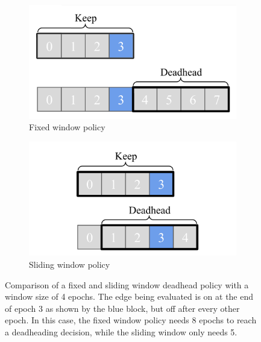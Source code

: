 \begin{figure}[ht!]
\centering
\begin{subfigure}{.5\textwidth}
  \centering
  \includegraphics[width=\linewidth]{dh/fixed}
  \caption{Fixed window policy}
\end{subfigure}%
\begin{subfigure}{.5\textwidth}
  \centering
  \includegraphics[width=\linewidth]{dh/sliding}
  \caption{Sliding window policy}
\end{subfigure}
\caption[Comparison of fixed and sliding window deadhead policies]{Comparison of a fixed and sliding window deadhead policy with a window size of 4 epochs. The edge being evaluated
	is on at the end of epoch 3 as shown by the blue block, but off after every other epoch.
	In this case, the fixed window policy needs 8 epochs to reach a deadheading decision, while the sliding window
	only needs 5.}
\label{fig:dhwindow}
\end{figure}

